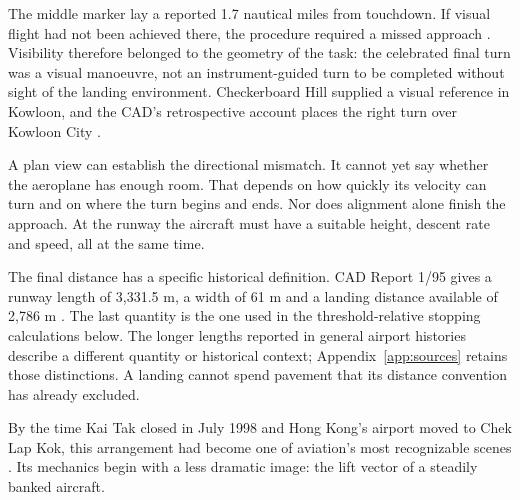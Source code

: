 
\begin{samepage}
The middle marker lay a reported 1.7 nautical miles from touchdown. If visual flight had not been achieved there, the procedure required a missed approach \citep[§1.8.1]{cad}. Visibility therefore belonged to the geometry of the task: the celebrated final turn was a visual manoeuvre, not an instrument-guided turn to be completed without sight of the landing environment. Checkerboard Hill supplied a visual reference in Kowloon, and the CAD's retrospective account places the right turn over Kowloon City \citep{cadlink}.
\par
\end{samepage}

A plan view can establish the directional mismatch. It cannot yet say whether the aeroplane has enough room. That depends on how quickly its velocity can turn and on where the turn begins and ends. Nor does alignment alone finish the approach. At the runway the aircraft must have a suitable height, descent rate and speed, all at the same time.

The final distance has a specific historical definition. CAD Report 1/95 gives a runway length of 3,331.5 m, a width of 61 m and a landing distance available of 2,786 m \citep[§1.10]{cad}. The last quantity is the one used in the threshold-relative stopping calculations below. The longer lengths reported in general airport histories describe a different quantity or historical context; Appendix~\ref{app:sources} retains those distinctions. A landing cannot spend pavement that its distance convention has already excluded.

By the time Kai Tak closed in July 1998 and Hong Kong's airport moved to Chek Lap Kok, this arrangement had become one of aviation's most recognizable scenes \citep{cadlink}. Its mechanics begin with a less dramatic image: the lift vector of a steadily banked aircraft.
